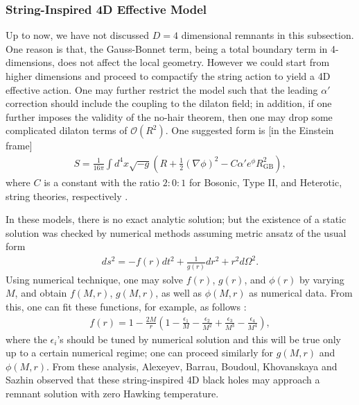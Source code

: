 \documentclass[12pt]{article}
\newcommand{\2}{$^2$}
\newcommand{\3}{$^3$}
\newcommand{\4}{$_4$}
\newcommand{\5}{$_5$}
\begin{document}
\subsubsection{String-Inspired 4D Effective Model}

Up to now, we have not discussed $D=4$ dimensional remnants in this subsection. One reason is that, the Gauss-Bonnet term, being a total boundary term in 4-dimensions, does not affect the local geometry. However we could start from higher dimensions and proceed to compactify the string action to yield a 4D effective action. One may further restrict the model such that the leading $\alpha'$ correction should include the coupling to the dilaton field; in addition, if one further imposes the validity of the no-hair theorem, then one may drop some complicated dilaton terms of $\mathcal{O}(R^{2})$. One suggested form is [in the Einstein frame] \cite{Kanti:1995vq} 
\begin{eqnarray}
S = \frac{1}{16\pi } \int d^{4}x \sqrt{-g} \left( R + \frac{1}{2}\left(\nabla \phi\right)^{2} - C \alpha' e^{\phi} R_{\mathrm{GB}}^{2} \right),
\end{eqnarray}
where $C$ is a constant with the ratio $2:0:1$ for Bosonic, Type II, and Heterotic, string theories, respectively \cite{Ratioc}. 

In these models, there is no exact analytic solution; but the existence of a static solution was checked by numerical methods \cite{Kanti:1995vq} assuming metric ansatz of the usual form
\begin{eqnarray}
ds^{2} = - f(r) dt^{2} + \frac{1}{g(r)} dr^{2} + r^{2} d\Omega^{2}.
\end{eqnarray}
Using numerical technique, one may solve $f(r)$, $g(r)$, and $\phi(r)$ by varying $M$, and obtain $f(M,r)$, $g(M,r)$, as well as $\phi(M, r)$ as numerical data. From this, one can fit these functions, for example, as follows \cite{Alexeyev:2002tg}:
\begin{eqnarray}
f(r) = 1 - \frac{2M}{r} \left( 1 - \frac{\epsilon_{1}}{M} - \frac{\epsilon_{2}}{M^{2}} + \frac{\epsilon_{3}}{M^{3}}- \frac{\epsilon_{4}}{M^{4}} \right),
\end{eqnarray}
where the $\epsilon_{i}$'s should be tuned by numerical solution and this will be true only up to a certain numerical regime; one can proceed similarly for $g(M,r)$ and $\phi(M, r)$. From these analysis, Alexeyev, Barrau, Boudoul, Khovanskaya and Sazhin \cite{Alexeyev:2002tg} observed that these string-inspired 4D black holes may approach a remnant solution with zero Hawking temperature.
\end{document}
